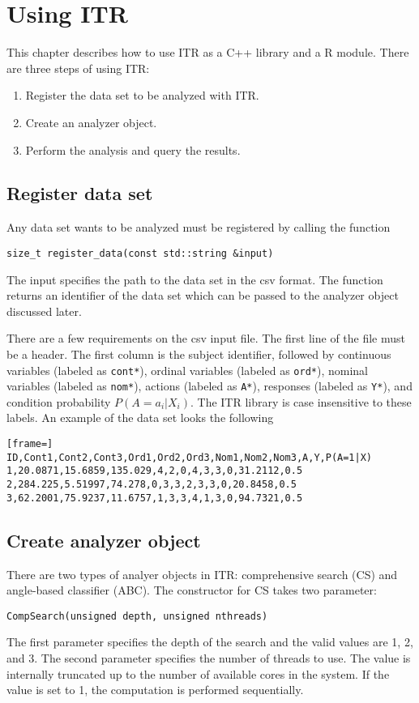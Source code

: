 \chapter{Using ITR}

This chapter describes how to use ITR as a C++ library and a R module. There
are three steps of using ITR:

\begin{enumerate}
\item Register the data set to be analyzed with ITR.
\item Create an analyzer object.
\item Perform the analysis and query the results.
\end{enumerate}

\section{Register data set}
Any data set wants to be analyzed must be registered by calling the function
%
\begin{lstlisting}
size_t register_data(const std::string &input)
\end{lstlisting}
%
The input specifies the path to the data set in the csv format. The function returns
an identifier of the data set which can be passed to the analyzer object discussed
later.

There are a few requirements on the csv input file. The first line of the file must
be a header. The first column is the subject identifier, followed by
continuous variables (labeled as {\tt cont*}), ordinal variables (labeled
as {\tt ord*}), nominal variables (labeled as {\tt nom*}), actions (labeled
as {\tt A*}), responses (labeled as {\tt Y*}), and condition probability
$P(A = a_i |X_i)$. The ITR library is case insensitive to these labels. An example of
the data set looks the following

\begin{lstlisting}[frame=]
ID,Cont1,Cont2,Cont3,Ord1,Ord2,Ord3,Nom1,Nom2,Nom3,A,Y,P(A=1|X)
1,20.0871,15.6859,135.029,4,2,0,4,3,3,0,31.2112,0.5
2,284.225,5.51997,74.278,0,3,3,2,3,3,0,20.8458,0.5
3,62.2001,75.9237,11.6757,1,3,3,4,1,3,0,94.7321,0.5
\end{lstlisting}

\section{Create analyzer object}
There are two types of analyer objects in ITR: comprehensive search (CS) and
angle-based classifier (ABC). The constructor for CS takes two parameter:
\begin{lstlisting}
CompSearch(unsigned depth, unsigned nthreads)
\end{lstlisting}
The first parameter specifies the depth of the search and the valid values are
1, 2, and 3. The second parameter specifies the number of threads to use. The value
is internally truncated up to the number of available cores in the system. If
the value is set to 1, the computation is performed sequentially. 

